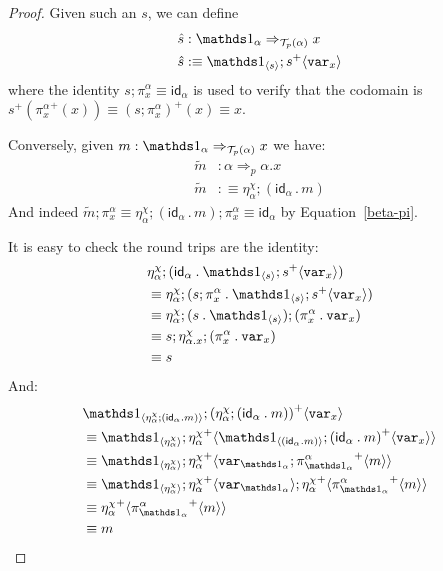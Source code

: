 \documentclass[10pt]{article}
\theoremstyle{definition}
\newcommand{\tcell}{\Rightarrow}
\newcommand{\id}{\mathsf{id}}
\newcommand\TrPlus[2]{\ensuremath{{#1}^+(#2)}}
\newcommand\El[2]{\mathcal{T}_{#1}(#2)}
\newcommand\bdot[0]{\mathbin{.}}
\newcommand\ApPlus[2]{\ensuremath{{#1}^+ \langle #2 \rangle }}
\begin{document}
\begin{proof}
Given such an $s$, we can define
\begin{align*}
\hat{s} &: \One_\alpha \tcell_{\El{p}{\alpha}} x \\
\hat{s} &:\equiv \ApOne{s};\ApPlus{s}{\var{x}}
\end{align*}
where the identity $s;\pi^\alpha_x \equiv \id_\alpha$ is used to verify that the codomain is $\TrPlus{s}{\TrPlus{\pi^\alpha_x}{x}} \equiv \TrPlus{(s;\pi^\alpha_x)}{x} \equiv x$.

Conversely, given $m : \One_\alpha \tcell_{\El{p}{\alpha}} x$ we have:
\begin{align*}
\tilde{m} &: \alpha \tcell_p \alpha.x \\
\tilde{m} &:\equiv \eta^\chi_\alpha ; (\id_\alpha \bdot m)
\end{align*}
And indeed $\tilde{m};\pi^\alpha_x \equiv \eta^\chi_\alpha ; (\id_\alpha \bdot m);\pi^\alpha_x \equiv \id_\alpha$ by Equation~\eqref{beta-pi}.

It is easy to check the round trips are the identity:
\begin{align*}
&\eta^\chi_\alpha ; (\id_\alpha \bdot \ApOne{s};\ApPlus{s}{\var{x}}) \\
&\equiv \eta^\chi_\alpha ; (s;\pi^\alpha_x \bdot \ApOne{s};\ApPlus{s}{\var{x}}) \\
&\equiv \eta^\chi_\alpha ; (s \bdot \ApOne{s});(\pi^\alpha_x \bdot \var{x}) \\
&\equiv s;\eta^\chi_{\alpha.x} ; (\pi^\alpha_x \bdot \var{x}) \\
&\equiv s
\end{align*}
And:
\begin{align*}
&\ApOne{\eta^\chi_\alpha ; (\id_\alpha \bdot m)};\ApPlus{(\eta^\chi_\alpha ; (\id_\alpha \bdot m))}{\var{x}} \\
&\equiv \ApOne{\eta^\chi_\alpha};\ApPlus{\eta^\chi_\alpha}{\ApOne{(\id_\alpha \bdot m)};\ApPlus{(\id_\alpha \bdot m)}{\var{x}}} \\
&\equiv \ApOne{\eta^\chi_\alpha};\ApPlus{\eta^\chi_\alpha}{\var{\One_\alpha};\ApPlus{\pi^\alpha_{\One_\alpha}}{m}} \\
&\equiv \ApOne{\eta^\chi_\alpha};\ApPlus{\eta^\chi_\alpha}{\var{\One_\alpha}};\ApPlus{\eta^\chi_\alpha}{\ApPlus{\pi^\alpha_{\One_\alpha}}{m}} \\
&\equiv \ApPlus{\eta^\chi_\alpha}{\ApPlus{\pi^\alpha_{\One_\alpha}}{m}} \\
&\equiv m
\end{align*}
\end{proof}
\end{document}
